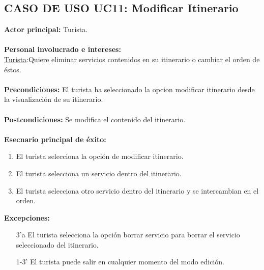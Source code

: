 \documentclass[12pt]{article}
\begin{document}
\subsection{\textbf{CASO DE USO UC11: Modificar Itinerario}  }
\textbf{Actor principal:} Turista.\\
\\
\textbf{Personal involucrado e intereses: }\\
\underline{Turista}:Quiere eliminar servicios contenidos en su itinerario o cambiar el orden de éstos.
\\\\
\textbf{Precondiciones:} El turista ha seleccionado la opcion modificar itinerario desde la visualización de su itinerario.\\
\\
\textbf{Postcondiciones:} Se modifica el contenido del itinerario.\\
\\
\textbf{Esecnario principal de éxito:}
\begin{enumerate}
\item El turista selecciona la opción de modificar itinerario.
\item El turista selecciona un servicio dentro del itinerario.
\item El turista selecciona otro servicio dentro del itinerario y se intercambian en el orden.
\end{enumerate}
\textbf{Excepciones:}
\begin{enumerate}
\item[3'a] El turista selecciona la opción borrar servicio para borrar el servicio seleccionado del itinerario.
\item[1-3'] El turista puede salir en cualquier momento del modo edición.
\end{enumerate}


\newpage
\end{document}
